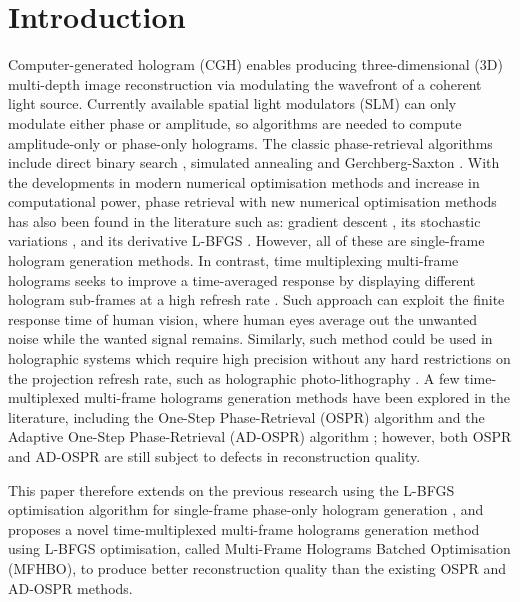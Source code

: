 \section{Introduction}
	Computer-generated hologram (CGH) enables producing three-dimensional (3D) multi-depth image reconstruction via modulating the wavefront of a coherent light source. Currently available spatial light modulators (SLM) can only modulate either phase or amplitude, so algorithms are needed to compute amplitude-only or phase-only holograms. The classic phase-retrieval algorithms include direct binary search \cite{Seldowitz1987}, simulated annealing \cite{Kirkpatrick1983} and Gerchberg-Saxton \cite{Gerchberg1972}. With the developments in modern numerical optimisation methods and increase in computational power, phase retrieval with new numerical optimisation methods has also been found in the literature such as: gradient descent \cite{Zhang2017, Liu2020}, its stochastic variations \cite{Chen2021, Choi2021, Kadis2022}, and its derivative L-BFGS \cite{Sha2022, Sha2023}. However, all of these are single-frame hologram generation methods. In contrast, time multiplexing multi-frame holograms seeks to improve a time-averaged response by displaying different hologram sub-frames at a high refresh rate \cite{Amako1995}. Such approach can exploit the finite response time of human vision, where human eyes average out the unwanted noise while the wanted signal remains. Similarly, such method could be used in holographic systems which require high precision without any hard restrictions on the projection refresh rate, such as holographic photo-lithography \cite{Bay2010}. A few time-multiplexed multi-frame holograms generation methods have been explored in the literature, including the One-Step Phase-Retrieval (OSPR) algorithm \cite{Cable2004} and the Adaptive One-Step Phase-Retrieval (AD-OSPR) algorithm \cite{Kaczorowski2016}; however, both OSPR and AD-OSPR are still subject to defects in reconstruction quality.

	This paper therefore extends on the previous research using the L-BFGS optimisation algorithm for single-frame phase-only hologram generation \cite{Sha2022, Sha2023}, and proposes a novel time-multiplexed multi-frame holograms generation method using L-BFGS optimisation, called Multi-Frame Holograms Batched Optimisation (MFHBO), to produce better reconstruction quality than the existing OSPR and AD-OSPR methods.


